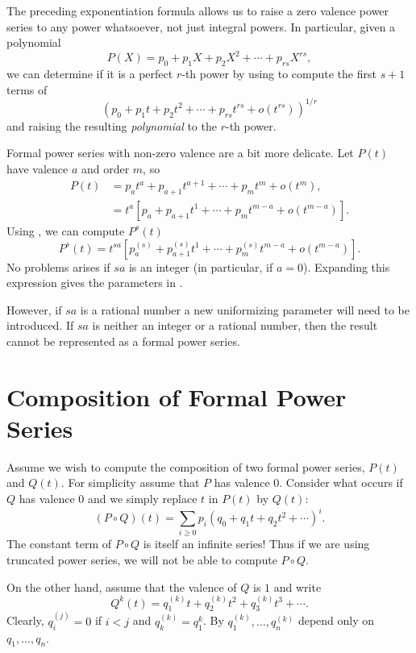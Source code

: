 The preceding exponentiation formula
 allows us to raise a zero valence power
series to any power whatsoever, not just integral powers.  In
particular, given a polynomial
\[
P(X) = p_0 + p_1 X + p_2 X^2 + \cdots + p_{rs} X^{rs},
\]
we can determine if it is a perfect $r$-th power by using
 to compute the first $s+1$ terms of
\[
\left( p_0 + p_1 t + p_2 t^2 + \cdots + p_{rs} t^{rs} + o(t^{rs})\right)^{1/r}
\]
and raising the resulting {\em polynomial} to the $r$-th power.

Formal power series with non-zero valence are a bit more delicate.
Let $P(t)$ have valence $a$ and order $m$, so 
\[
\begin{aligned}
P(t) &= p_a t^a + p_{a+1} t^{a+1} + \cdots + p_m t^m + o(t^m), \\
  & = t^a \left[p_a + p_{a+1} t^{1} + \cdots + p_m t^{m-a} + o(t^{m-a})\right].
\end{aligned}
\]
Using , we can compute $P^s(t)$
\[
P^s(t) = t^{sa}
\left[p^{(s)}_a + p^{(s)}_{a+1} t^{1} + \cdots + p^{(s)}_m t^{m-a} + o(t^{m-a})\right].
\]
No problems arises if $sa$ is an integer (in particular, if $a = 0$).
Expanding this expression gives the parameters in
. 

However, if $sa$ is a rational number a new uniformizing parameter
will need to be introduced.  If $sa$ is neither an integer or a
rational number, then the result cannot be represented as a formal
power series. 

\section{Composition of Formal Power Series}
\label{FPS:Subst:Sec}

Assume we wish to compute the composition of two formal power series,
$P(t)$ and $Q(t)$.  For simplicity assume that $P$ has valence $0$.
Consider what occurs if $Q$ has valence $0$ and we simply replace $t$ in
$P(t)$ by $Q(t)$:
\[
(P\circ Q)(t) = \sum_{i\ge 0} p_i \left(q_0 + q_1 t + q_2 t^2 +
\cdots\right)^i.
\]
The constant term of $P\circ Q$ is itself an infinite series!  Thus if
we are using truncated power series, we will not be able to compute
$P\circ Q$.

On the other hand, assume that the valence of $Q$ is $1$ and write
\[
Q^k(t) = q^{(k)}_1 t + q^{(k)}_2 t^2 + q^{(k)}_3 t^3 + \cdots.
\]
Clearly, $q^{(j)}_i = 0$ if $i < j$ and $q^{(k)}_k = q_1^k$.  By 
 $q^{(k)}_1, \ldots, q^{(k)}_n$ depend
only on $q_1, \ldots, q_n$. 

